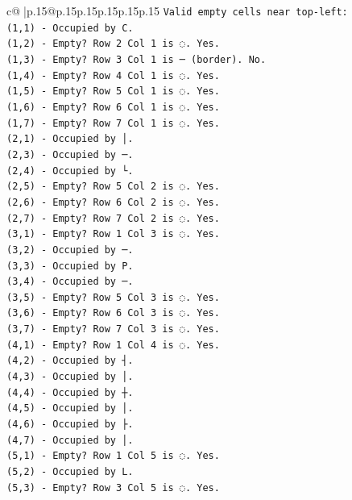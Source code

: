 \documentclass{article}
\begin{document}
{\begin{supertabular}{c@{$\;$}|p{.15\linewidth}@{}p{.15\linewidth}p{.15\linewidth}p{.15\linewidth}p{.15\linewidth}p{.15\linewidth}}
{{{\texttt{Valid empty cells near top{-}left:} \\
\texttt{(1,1) {-} Occupied by C.} \\
\texttt{(1,2) {-} Empty? Row 2 Col 1 is ◌. Yes.} \\
\texttt{(1,3) {-} Empty? Row 3 Col 1 is ─ (border). No.} \\
\texttt{(1,4) {-} Empty? Row 4 Col 1 is ◌. Yes.} \\
\texttt{(1,5) {-} Empty? Row 5 Col 1 is ◌. Yes.} \\
\texttt{(1,6) {-} Empty? Row 6 Col 1 is ◌. Yes.} \\
\texttt{(1,7) {-} Empty? Row 7 Col 1 is ◌. Yes.} \\
\texttt{(2,1) {-} Occupied by │.} \\
\texttt{(2,3) {-} Occupied by ─.} \\
\texttt{(2,4) {-} Occupied by └.} \\
\texttt{(2,5) {-} Empty? Row 5 Col 2 is ◌. Yes.} \\
\texttt{(2,6) {-} Empty? Row 6 Col 2 is ◌. Yes.} \\
\texttt{(2,7) {-} Empty? Row 7 Col 2 is ◌. Yes.} \\
\texttt{(3,1) {-} Empty? Row 1 Col 3 is ◌. Yes.} \\
\texttt{(3,2) {-} Occupied by ─.} \\
\texttt{(3,3) {-} Occupied by P.} \\
\texttt{(3,4) {-} Occupied by ─.} \\
\texttt{(3,5) {-} Empty? Row 5 Col 3 is ◌. Yes.} \\
\texttt{(3,6) {-} Empty? Row 6 Col 3 is ◌. Yes.} \\
\texttt{(3,7) {-} Empty? Row 7 Col 3 is ◌. Yes.} \\
\texttt{(4,1) {-} Empty? Row 1 Col 4 is ◌. Yes.} \\
\texttt{(4,2) {-} Occupied by ┤.} \\
\texttt{(4,3) {-} Occupied by │.} \\
\texttt{(4,4) {-} Occupied by ┼.} \\
\texttt{(4,5) {-} Occupied by │.} \\
\texttt{(4,6) {-} Occupied by ├.} \\
\texttt{(4,7) {-} Occupied by │.} \\
\texttt{(5,1) {-} Empty? Row 1 Col 5 is ◌. Yes.} \\
\texttt{(5,2) {-} Occupied by L.} \\
\texttt{(5,3) {-} Empty? Row 3 Col 5 is ◌. Yes.} \\
}}}
\end{supertabular}}
\end{document}
